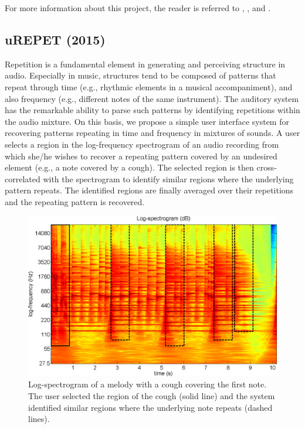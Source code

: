 \documentclass{article}
\begin{document}
For more information about this project, the reader is referred to \cite{inproceedings_rafii_oct2012}, \cite{inproceedings_rafii_may2013}, and \cite{inbook_rafii_2014}.


\subsection{uREPET (2015)}
\label{ssec:urepet}

Repetition is a fundamental element in generating and perceiving structure in audio. Especially in music, structures tend to be composed of patterns that repeat through time (e.g., rhythmic elements in a musical accompaniment), and also frequency (e.g., different notes of the same instrument). The auditory system has the remarkable ability to parse such patterns by identifying repetitions within the audio mixture. On this basis, we propose a simple user interface system for recovering patterns repeating in time and frequency in mixtures of sounds. A user selects a region in the log-frequency spectrogram of an audio recording from which she/he wishes to recover a repeating pattern covered by an undesired element (e.g., a note covered by a cough). The selected region is then cross-correlated with the spectrogram to identify similar regions where the underlying pattern repeats. The identified regions are finally averaged over their repetitions and the repeating pattern is recovered.

\begin{figure}[!htb]
\centering
\includegraphics[width=\columnwidth]{Images/urepet_example1a.png}
\caption{Log-spectrogram of a melody with a cough covering the first note. The user selected the region of the cough (solid line) and the system identified similar regions where the underlying note repeats (dashed lines).}
\label{fig:urepet_example1a}
\end{figure}
\end{document}

